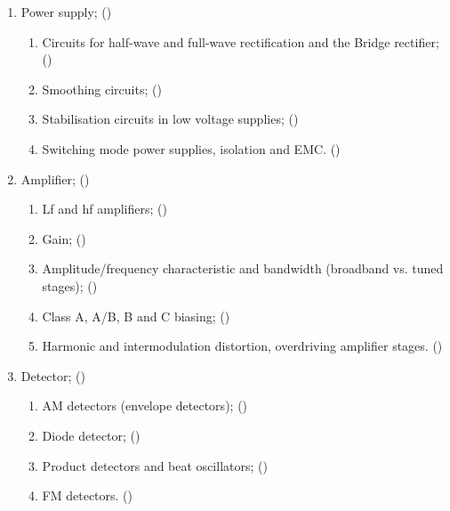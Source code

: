 \begin{flushleft}
\begin{enumerate}
\begin{enumerate}
\item Power supply; ()\label{HAREC.a.3.3}
\begin{enumerate}
\item Circuits for half-wave and full-wave rectification and the Bridge
  rectifier; ()\label{HAREC.a.3.3.1}
\item Smoothing circuits; ()\label{HAREC.a.3.3.2}
\item Stabilisation circuits in low voltage supplies;
  ()\label{HAREC.a.3.3.3}
\item Switching mode power supplies, isolation and EMC.
  ()\label{HAREC.a.3.3.4}
\end{enumerate}

\item Amplifier; ()\label{HAREC.a.3.4}
\begin{enumerate}
\item Lf and hf amplifiers; ()\label{HAREC.a.3.4.1}
\item Gain; ()\label{HAREC.a.3.4.2}
\item Amplitude/frequency characteristic and bandwidth (broadband vs.
  tuned stages); ()\label{HAREC.a.3.4.3}
\item Class A, A/B, B and C biasing;
  ()\label{HAREC.a.3.4.4}
\item Harmonic and intermodulation distortion, overdriving amplifier stages.
  ()\label{HAREC.a.3.4.5}
\end{enumerate}

\item Detector; ()\label{HAREC.a.3.5}
\begin{enumerate}
\item AM detectors (envelope detectors);
  ()\label{HAREC.a.3.5.1}
\item Diode detector; ()\label{HAREC.a.3.5.2}
\item Product detectors and beat oscillators;
  ()\label{HAREC.a.3.5.3}
\item FM detectors. ()\label{HAREC.a.3.5.4}
\end{enumerate}


\end{enumerate}
\end{enumerate}
\end{flushleft}
